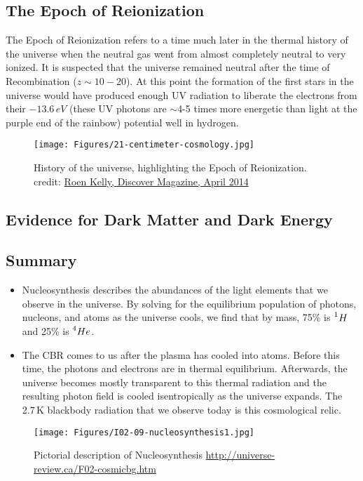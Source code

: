 \subsection{The Epoch of Reionization}
The Epoch of Reionization refers to a time much later in the thermal history of the universe when the neutral gas went from almost completely neutral to very ionized. It is suspected that the
universe remained neutral after the time of Recombination ($z \sim 10-20$). At this point the formation of the first stars in the universe would have produced enough UV radiation to liberate the electrons from their $-13.6\,eV$ (these UV photons are $\sim$4-5 times more energetic than light at the purple end of the rainbow) potential well in hydrogen. 
\begin{figure}[h]
\centering
\texttt{[image: Figures/21-centimeter-cosmology.jpg]}
\caption{History of the universe, highlighting the Epoch of Reionization.
credit: \href{http://discovermagazine.com/2014/april/12-first-light}{Roen Kelly, Discover Magazine, April 2014}}
\label{fig:EoR}
\end{figure}

\subsection{Evidence for Dark Matter and Dark Energy}

\subsection{Summary}
\begin{itemize}
\item Nucleosynthesis describes the abundances of the light elements 
	that we observe in the universe. By solving for the equilibrium
	population of photons, nucleons, and atoms as the universe cools,
	we find that by mass, 75\% is $\prescript{1}{}H$ 
	and 25\% is $\prescript{4}{}He$.

\item The CBR comes to us after the plasma has cooled into atoms. 
	Before this time, the photons and electrons are in thermal 
	equilibrium. Afterwards, the universe becomes mostly transparent 
	to this thermal radiation and the resulting photon field is 
	cooled isentropically as the universe expands. The 2.7\,K 
	blackbody radiation that we observe today is this cosmological relic.
\end{itemize}

\begin{figure}[h]
\centering
\texttt{[image: Figures/I02-09-nucleosynthesis1.jpg]}
\caption{Pictorial description of Nucleosynthesis \url{http://universe-review.ca/F02-cosmicbg.htm}}
\label{fig:NucleoSynthGraphic}
\end{figure}

